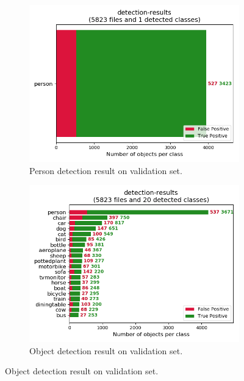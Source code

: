 \begin{figure}
    \begin{subfigure}
        \centering
        \includegraphics[scale=0.8]{figures/eval_detector_result.png}
        \caption{Person detection result on validation set.}
        \label{fig:eval-detector-result}
    \end{subfigure}
    \begin{subfigure}
        \centering
        \includegraphics[scale=0.8]{figures/eval_detector_result1.png}
        \caption{Object detection result on validation set.}
        \label{fig:eval-detector-result1}
    \end{subfigure}
\end{figure}


